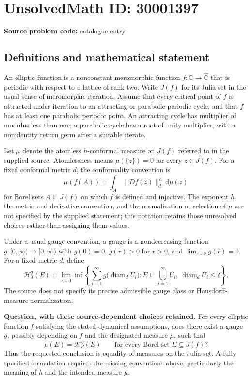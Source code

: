 \documentclass[11pt]{article}
\newcommand{\C}{\mathbb{C}}
\begin{document}
\section*{UnsolvedMath ID: 30001397}
\textbf{Source problem code:} catalogue entry
\subsection{Definitions and mathematical statement}
An elliptic function is a nonconstant meromorphic function \(f\colon\C\to\widehat{\C}\) that is periodic with respect to a lattice of rank two. Write \(J(f)\) for its Julia set in the usual sense of meromorphic iteration. Assume that every critical point of \(f\) is attracted under iteration to an attracting or parabolic periodic cycle, and that \(f\) has at least one parabolic periodic point. An attracting cycle has multiplier of modulus less than one; a parabolic cycle has a root-of-unity multiplier, with a nonidentity return germ after a suitable iterate.

Let \(\mu\) denote the atomless \(h\)-conformal measure on \(J(f)\) referred to in the supplied source. Atomlessness means \(\mu(\{z\})=0\) for every \(z\in J(f)\). For a fixed conformal metric \(d\), the conformality convention is
\[
\mu(f(A))=\int_A \|Df(z)\|_d^{\,h}\,\mathrm d\mu(z)
\]
for Borel sets \(A\subseteq J(f)\) on which \(f\) is defined and injective. The exponent \(h\), the metric and derivative convention, and the normalization or selection of \(\mu\) are not specified by the supplied statement; this notation retains those unresolved choices rather than assigning them values.

Under a usual gauge convention, a gauge is a nondecreasing function \(g\colon[0,\infty)\to[0,\infty)\) with \(g(0)=0\), \(g(r)>0\) for \(r>0\), and \(\lim_{r\downarrow0}g(r)=0\). For a fixed metric \(d\), define
\[
\mathcal H_d^g(E)=\lim_{\delta\downarrow0}\inf\left\{\sum_{i=1}^{\infty}g\bigl(\operatorname{diam}_d U_i\bigr): E\subseteq\bigcup_{i=1}^{\infty}U_i,\ \operatorname{diam}_d U_i\leq\delta\right\}.
\]
The source does not specify its precise admissible gauge class or Hausdorff-measure normalization.

\textbf{Question, with these source-dependent choices retained.} For every elliptic function \(f\) satisfying the stated dynamical assumptions, does there exist a gauge \(g\), possibly depending on \(f\) and the designated measure \(\mu\), such that
\[
\mu(E)=\mathcal H_d^g(E)\qquad\text{for every Borel set }E\subseteq J(f)?
\]
Thus the requested conclusion is equality of measures on the Julia set. A fully specified formulation requires the missing conventions above, particularly the meaning of \(h\) and the intended measure \(\mu\).
\end{document}
